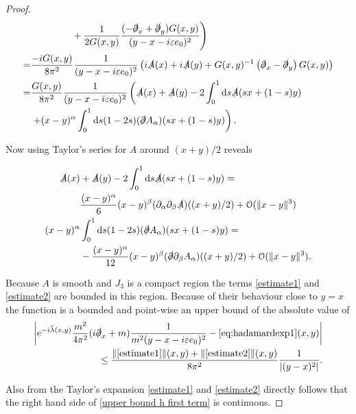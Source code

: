 \documentclass[b5paper,draft,openbib,12pt]{memoir}
\begin{document}
\begin{proof}
\begin{align}
&\hspace{1.5cm}+\frac{1}{2G(x,y)} \frac{(-\slashed{\partial}_x+ \slashed{\partial}_y )G(x,y)}{(y-x-i\varepsilon e_0)^2}\Bigg)\\\nonumber
=&\frac{-iG(x,y)}{8\pi^2}  \frac{1}{(y-x-i\varepsilon e_0)^2} \left(i\slashed{A}(x) + i\slashed{A}(y)
+G(x,y)^{-1} \left( \slashed{\partial}_x- \slashed{\partial}_y\right) G(x,y) \right)\\\nonumber
=&\frac{G(x,y)}{8\pi^2} \frac{1}{(y-x-i\varepsilon e_0)^2} \left(\slashed{A}(x) + \slashed{A}(y)
-  2 \int_0^1 \mathrm{d}s \slashed{A}(s x + (1-s)y)  \right.\\
&\left.+(x-y)^\alpha \int_0^1 \mathrm{d}s (1-2s) (\slashed{\partial}A_\alpha)(sx+(1-s)y)   \right).
\end{align}

Now using Taylor's series for \(A\) around \((x+y)/2\) reveals 

\begin{align}\nonumber
\slashed{A}(x)& + \slashed{A}(y)- 2 \int_0^1 \mathrm{d}s \slashed{A}(s x + (1-s)y) =  \\\label{estimate1}
&\frac{(x-y)^\alpha}{6} (x-y)^\beta (\partial_\alpha \partial_\beta \slashed{A})((x+y)/2)+ \mathcal{O}(\|x-y\|^3)\\\label{estimate2}
(x-y)^\alpha &\int_0^1 \mathrm{d}s (1-2s) (\slashed{\partial}A_\alpha)(sx+(1-s)y)=
  \\\notag
& -\frac{(x-y)^\alpha}{12}(x-y)^\beta  (\slashed{\partial}\partial_\beta A_\alpha)((x+y)/2) + \mathcal{O}(\|x-y\|^3).
\end{align}

Because \(A\) is smooth and \(J_3\) is a compact region the terms \eqref{estimate1} and \eqref{estimate2} are 
bounded in this region. Because of their behaviour close to \(y=x\)
the function
is a bounded and point-wise an upper bound of the absolute value of 
\begin{align}
\left|e^{-i\tilde{\lambda}(x,y)} \frac{m^2}{4\pi^2} (i\slashed{\partial}_x+m)\frac{1}{m^2(y-x-i\varepsilon e_0)^2} -\eqref{eq:hadamardexp1}(x,y)\right|\\
\label{upper bound h first term}
\le\frac{\|\eqref{estimate1}\|(x,y)+\|\eqref{estimate2}\|(x,y)}{8\pi^2}\frac{1}{|(y-x)^2|}.
\end{align}

Also from the Taylor's expansion \eqref{estimate1} and \eqref{estimate2} directly follows that the right hand side of \eqref{upper bound h first term} is continuous.
\end{proof}
\end{document}
